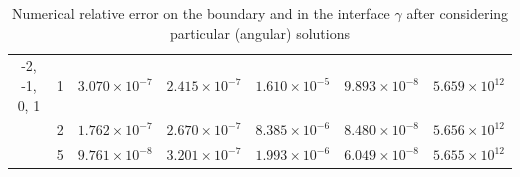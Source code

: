 \begin{table}[htbp]
\begin{longtable}{ccccccc}
        -2, -1, 0, 1 & 1 & $3.070\times10^{-7}$ & $2.415\times10^{-7}$ & $1.610\times10^{-5}$ & $9.893\times10^{-8}$ & $5.659\times10^{12}$ \\
        & 2 & $1.762\times10^{-7}$ & $2.670\times10^{-7}$ & $8.385\times10^{-6}$ & $8.480\times10^{-8}$ & $5.656\times10^{12}$ \\
        & 5 & $9.761\times10^{-8}$ & $3.201\times10^{-7}$ & $1.993\times10^{-6}$ & $6.049\times10^{-8}$ & $5.655\times10^{12}$ \\
        \midrule[\heavyrulewidth] %
    \end{longtable}
    \caption{Numerical relative error on the boundary and in the interface \(\gamma\) after considering particular (angular) solutions}
    \label{tab:transmission_results_L_shape_axis_particular}
\end{table}

        
